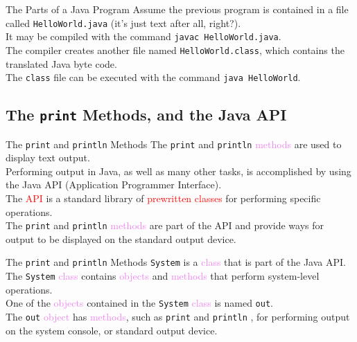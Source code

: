 \documentclass[11pt]{beamer}
\newcommand{\red}[1]{\textcolor{red}{#1}}
\newcommand{\violet}[1]{\textcolor{violet}{#1}}
\begin{document}
\begin{frame}[fragile]{The Parts of a Java Program}
    Assume the previous program is contained in a file called \texttt{HelloWorld.java} (it's just text after all, right?). \\ \vspace{1em}
    It may be compiled with the command \texttt{javac HelloWorld.java}. \\ \vspace{1em}
    The compiler creates another file named \texttt{HelloWorld.class}, which contains the translated Java byte code. \\ \vspace{1em}
    The \texttt{class} file can be executed with the command \texttt{java HelloWorld}.
\end{frame}

\subsection{The \texttt{print} Methods, and the Java API}
\begin{frame}[fragile]{The \texttt{print} and \texttt{println} Methods}
    The \texttt{print} and \texttt{println} \violet{methods} are used to display text output. \\ \vspace{1em}
    Performing output in Java, as well as many other tasks, is accomplished by using the Java API (Application Programmer Interface). \\ \vspace{1em}
    The \red{API} is a standard library of \red{prewritten classes} for performing specific operations. \\ \vspace{1em}
    The \texttt{print} and \texttt{println} \violet{methods} are part of the API and provide ways for output to be displayed on the standard output device.
\end{frame}

\begin{frame}[fragile]{The \texttt{print} and \texttt{println} Methods}
    \texttt{System} is a \violet{class} that is part of the Java API. \\ \vspace{1em}
    The \texttt{System} \violet{class} contains \violet{objects} and \violet{methods} that perform system-level operations. \\ \vspace{1em}
     One of the \violet{objects} contained in the \texttt{System} \violet{class} is named \texttt{out}. \\ \vspace{1em}
     The \texttt{out} \violet{object} has \violet{methods}, such as \texttt{print} and \texttt{println} , for performing output on the system console, or standard output device.
\end{frame}
\end{document}
